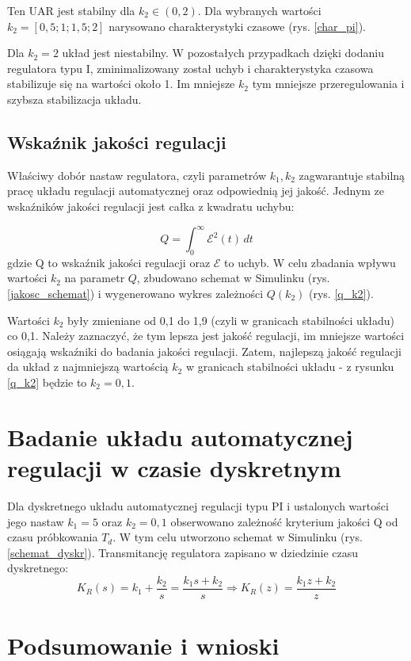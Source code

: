 \documentclass[12pt]{article}
\begin{document}

Ten UAR jest stabilny dla $k_2 \in (0,2)$. Dla wybranych wartości $k_2 = [0,5 ; 1 ; 1,5 ; 2]$ narysowano charakterystyki czasowe (rys. \ref{char_pi}).


Dla $k_2 = 2$ układ jest niestabilny. W pozostałych przypadkach dzięki dodaniu regulatora typu I, zminimalizowany został uchyb i charakterystyka czasowa stabilizuje się na wartości około 1. Im mniejsze $k_2$ tym mniejsze przeregulowania i szybsza stabilizacja układu.

\subsection{Wskaźnik jakości regulacji}
Właściwy dobór nastaw regulatora, czyli parametrów $k_1, k_2$ zagwarantuje stabilną pracę układu regulacji automatycznej oraz odpowiednią jej jakość. Jednym ze wskaźników jakości regulacji jest całka z kwadratu uchybu:

\begin{equation}
    Q = \int_{0}^{\infty} \mathcal{E} ^2 (t) \,dt 
\end{equation}
gdzie Q to wskaźnik jakości regulacji oraz $\mathcal{E}$ to uchyb. W celu zbadania wpływu wartości $k_2$ na parametr $Q$, zbudowano schemat w Simulinku (rys. \ref{jakosc_schemat}) i wygenerowano wykres zależności $Q(k_2)$ (rys. \ref{q_k2}).



Wartości $k_2$ były zmieniane od 0,1 do 1,9 (czyli w granicach stabilności układu) co 0,1. Należy zaznaczyć, że tym lepsza jest jakość regulacji, im mniejsze wartości osiągają wskaźniki do badania jakości regulacji. Zatem, najlepszą jakość regulacji da układ z najmniejszą wartością $k_2$ w granicach stabilności układu - z rysunku \ref{q_k2} będzie to $k_2 = 0,1$.

\section{Badanie układu automatycznej regulacji w czasie dyskretnym}
Dla dyskretnego układu automatycznej regulacji typu PI i ustalonych wartości jego nastaw $k_1 = 5$ oraz $k_2 = 0,1$ obserwowano zależność kryterium jakości Q od czasu próbkowania $T_d$. W tym celu utworzono schemat w Simulinku (rys. \ref{schemat_dyskr}). Transmitancję regulatora zapisano w dziedzinie czasu dyskretnego:
\begin{equation}
    K_R(s) = k_1 + \frac{k_2}{s} = \frac{k_1s+k_2}{s} \Rightarrow K_R(z) = \frac{k_1z+k_2}{z}
\end{equation}
\section{Podsumowanie i wnioski}
\end{document}
